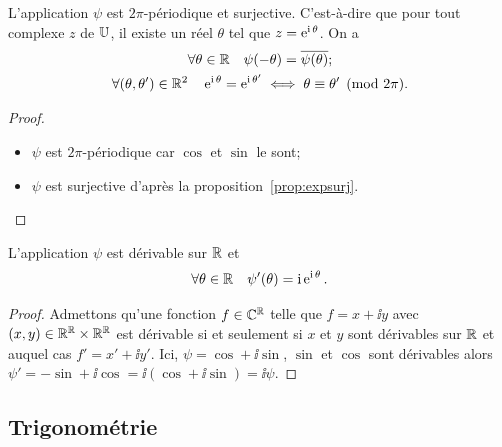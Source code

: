 \begin{prop}
  L'application \(\psi\) est  \(2\pi\)-périodique et surjective. C'est-à-dire que pour tout complexe \(z\) de \(\mathbb{U}\), il existe un réel \(\theta\) tel que \(z=\operatorname{e}^{\operatorname{i} \theta}\). On a
  \begin{gather}
    \forall \theta \in \mathbb{R} \quad \psi(-\theta)=\overline{\psi(\theta)};\\
    \forall (\theta, \theta') \in \mathbb{R}^2 \quad \operatorname{e}^{\operatorname{i} \theta}=\operatorname{e}^{\operatorname{i} \theta'} \iff \theta \equiv \theta' \pmod {2\pi}.
  \end{gather}
\end{prop}
\begin{proof}
  \begin{itemize}
  \item \(\psi\) est \(2\pi\)-périodique car \(\cos\) et \(\sin\) le sont;
  \item \(\psi\) est surjective d'après la proposition~\ref{prop:expsurj}.
  \end{itemize}
\end{proof}
%
\begin{prop}
  L'application \(\psi\) est dérivable sur \(\mathbb{R}\) et
  \begin{equation}
    \forall \theta \in \mathbb{R} \quad \psi'(\theta)=\operatorname{i} \operatorname{e}^{\operatorname{i} \theta}.
  \end{equation}
\end{prop}
\begin{proof}
  Admettons qu'une fonction \(f \in \mathbb{C}^{\mathbb{R}}\) telle que \(f=x+\ii y\) avec \((x,y) \in \mathbb{R}^{\mathbb{R}} \times \mathbb{R}^{\mathbb{R}}\) est dérivable si et seulement si \(x\) et \(y\) sont dérivables sur \(\mathbb{R}\) et auquel cas \(f'=x' +\ii y'\). Ici, \(\psi=\cos +\ii \sin\), \(\sin\) et \(\cos\) sont dérivables alors \(\psi'=-\sin + \ii \cos=\ii (\cos +\ii \sin)=\ii \psi\).
\end{proof}
%
\subsection{Trigonométrie}
\label{subsec:complexestrigo}
